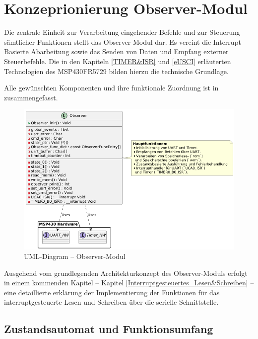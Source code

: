 \newpage
\section{Konzeprionierung Observer-Modul}
\label{ObserverModulKonzept}

Die zentrale Einheit zur Verarbeitung eingehender Befehle und zur Steuerung s\"amtlicher Funktionen stellt das Observer-Modul dar. Es vereint die Interrupt-Basierte Abarbeitung sowie das Senden von Daten und Empfang externer Steuerbefehle. Die in den Kapiteln \ref{TIMER&ISR} und \ref{eUSCI} erl\"auterten Technologien des MSP430FR5729 bilden hierzu die technische Grundlage.

Alle gew\"unschten Komponenten und ihre funktionale Zuordnung ist in  zusammengefasst.

\begin{figure}[h!]
	\centering
	\includegraphics[width=1.0\textwidth]{../Bilder/observer_class_diagram.png}
	\caption{UML-Diagram -- Observer-Modul}
	\label{fig:UmlDiagram_ObserverModul}
\end{figure}

Ausgehend vom grundlegenden Architekturkonzept des Observer-Moduls erfolgt in einem kommenden Kapitel -- Kapitel \ref{Interruptgesteuertes_Lesen&Schreiben} -- eine detaillierte erkl\"arung der Implementierung der Funktionen f\"ur das interruptgesteuerte Lesen und Schreiben \"uber die serielle Schnittstelle.


\newpage
\subsection{Zustandsautomat und Funktionsumfang}
\label{ZustaendeUndFunktionen}

